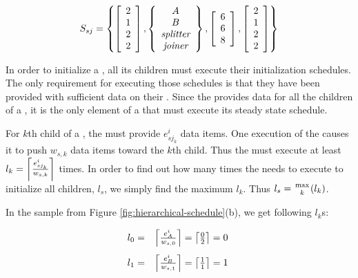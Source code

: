 \begin{displaymath}
S_{sj} = \left\{ \left[
\begin{array}{c} 2 \\ 1 \\ 2 \\ 2 \end{array}\right], \left\{
\begin{array}{c} A \\ B \\ {\emph{splitter}} \\ {\emph{joiner}} \end{array} \right\},
\left[ \begin{array}{c} 6 \\ 6 \\ 8
\end{array} \right], \left[
\begin{array}{c}
2 \\ 1 \\ 2 \\ 2
\end{array}\right]\right\}
\end{displaymath}


In order to initialize a {\splitjoin}, all its children must execute
their initialization schedules.  The only requirement for
executing those schedules is that they have been provided with
sufficient data on their {\Input} {{\Channels}}.  Since the {\splitter}
provides data for all the children of a {\splitjoin}, it is the only
element of a {\splitjoin} that must execute its steady state
schedule.

For $k$th child of a {\splitjoin}, the {\splitter} must provide
$e^i_{sj_k}$ data items.  One execution of the {\splitter} causes
it to push $w_{s,k}$ data items toward the $k$th child.  Thus the
{\splitter} must execute at least $l_k = \left\lceil e^i_{sj_k}
\over w_{s,k} \right\rceil$ times.  In order to find out how many
times the {\splitter} needs to execute to initialize all children,
$l_s$, we simply find the maximum $l_k$. Thus $l_s = {\max \atop
k}(l_k)$.

In the sample {\splitjoin} from Figure
\ref{fig:hierarchical-schedule}(b), we get following $l_k$s:

\begin{displaymath}
\begin{array}{rl}
l_0 = & \left\lceil e^i_A \over w_{s,0} \right\rceil = \left\lceil
0 \over 2 \right\rceil = 0 \raisebox{-0.2in}{ }\\
l_1 = & \left\lceil e^i_B \over w_{s,1} \right\rceil = \left\lceil
1 \over 1 \right\rceil = 1 \raisebox{-0.2in}{ }\\
\end{array}
\end{displaymath}

